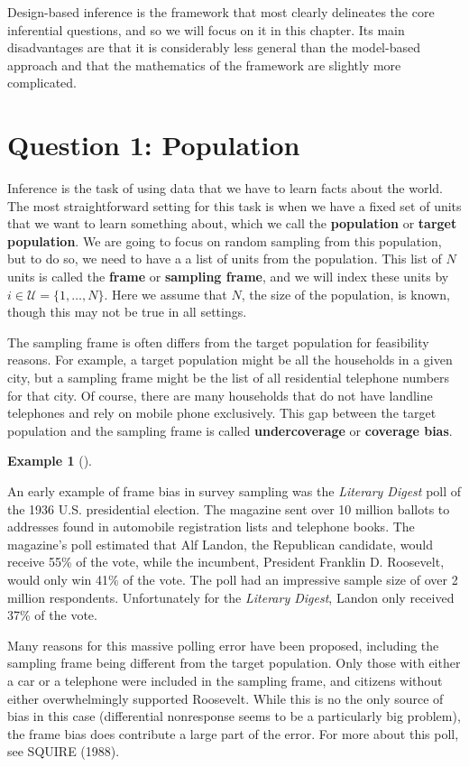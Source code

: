 \documentclass[
  letterpaper,
  DIV=11,
  numbers=noendperiod]{scrreprt}
\theoremstyle{definition}
\newtheorem{example}{Example}[chapter]
\theoremstyle{definition}
\theoremstyle{plain}
\theoremstyle{remark}
\begin{document}
Design-based inference is the framework that most clearly delineates the
core inferential questions, and so we will focus on it in this chapter.
Its main disadvantages are that it is considerably less general than the
model-based approach and that the mathematics of the framework are
slightly more complicated.

\hypertarget{question-1-population}{%
\section{Question 1: Population}\label{question-1-population}}

Inference is the task of using data that we have to learn facts about
the world. The most straightforward setting for this task is when we
have a fixed set of units that we want to learn something about, which
we call the \textbf{population} or \textbf{target population}. We are
going to focus on random sampling from this population, but to do so, we
need to have a a list of units from the population. This list of \(N\)
units is called the \textbf{frame} or \textbf{sampling frame}, and we
will index these units by \(i \in \mathcal{U} = \{1, \ldots, N\}\). Here
we assume that \(N\), the size of the population, is known, though this
may not be true in all settings.

The sampling frame is often differs from the target population for
feasibility reasons. For example, a target population might be all the
households in a given city, but a sampling frame might be the list of
all residential telephone numbers for that city. Of course, there are
many households that do not have landline telephones and rely on mobile
phone exclusively. This gap between the target population and the
sampling frame is called \textbf{undercoverage} or \textbf{coverage
bias}.

\begin{example}[]\protect\hypertarget{exm-frame-bias}{}\label{exm-frame-bias}

An early example of frame bias in survey sampling was the \emph{Literary
Digest} poll of the 1936 U.S. presidential election. The magazine sent
over 10 million ballots to addresses found in automobile registration
lists and telephone books. The magazine's poll estimated that Alf
Landon, the Republican candidate, would receive 55\% of the vote, while
the incumbent, President Franklin D. Roosevelt, would only win 41\% of
the vote. The poll had an impressive sample size of over 2 million
respondents. Unfortunately for the \emph{Literary Digest}, Landon only
received 37\% of the vote.

Many reasons for this massive polling error have been proposed,
including the sampling frame being different from the target population.
Only those with either a car or a telephone were included in the
sampling frame, and citizens without either overwhelmingly supported
Roosevelt. While this is no the only source of bias in this case
(differential nonresponse seems to be a particularly big problem), the
frame bias does contribute a large part of the error. For more about
this poll, see SQUIRE (1988).

\end{example}
\end{document}
